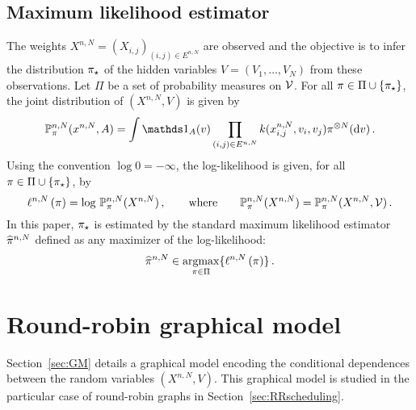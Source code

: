 \subsection{Maximum likelihood estimator}
The weights $X^{n,N}=(X_{i,j})_{(i,j)\in E^{n,N}}$ are observed and  the objective is to infer the distribution $\pi_{\star}$ of the hidden variables $V=(V_1,\ldots,V_N)$ from these observations. Let $\Pi$ be a set of probability measures on $\mathcal{V}$. For all $\pi\in\Pi\cup\{\pi_{\star}\}$, the joint distribution of $(X^{n,N},V)$ is given by
\begin{equation}
\label{eq:jointlaw}
\likelihood{n,N}{\pi}(x^{n,N},A)=\int\un{A}(v)\prod_{(i,j) \in E^{n,N}}k(x^{n,N}_{i,j},v_{i},v_j)\pi^{\otimes N}(\rmd v)\eqsp.
\end{equation}
Using the convention $\log 0=-\infty$, the log-likelihood is given, for all $\pi\in\Pi\cup\{\pi_{\star}\}$, by
\[
\ell^{n,N}\left(\pi\right) = \log\,\mathbb{P}^{n,N}_{\pi}(X^{n,N})\,,\qquad\text{where}\qquad  \mathbb{P}^{n,N}_{\pi}(X^{n,N})=\mathbb{P}^{n,N}_{\pi}(X^{n,N},\mathcal{V})\,.
\]
In this paper, $\pi_{\star}$ is estimated by the standard maximum likelihood estimator $\widehat{\pi}^{n,N}$ defined as any maximizer of the log-likelihood:
\[
\widehat{\pi}^{n,N}\in \operatorname*{argmax}_{\pi\in\Pi}\{\ell^{n,N}\left(\pi\right)\}\,.
\]


\section{Round-robin graphical model}
\label{sec:CondDep}
%
Section~\ref{sec:GM} details a graphical model encoding the conditional dependences between the random variables $(X^{n,N},V)$. This graphical model is studied in the particular case of round-robin graphs in Section~\ref{sec:RRscheduling}. 
%
